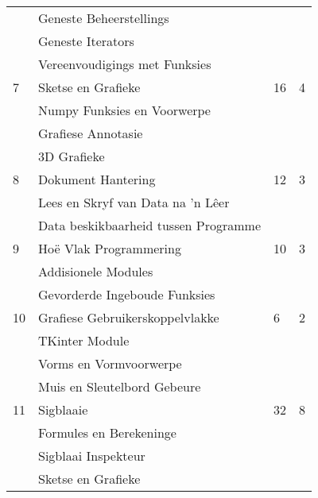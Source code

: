 \begin{table}[!h]
\begin{tabular}{|p{1.4cm}|l|p{2cm}|p{2cm}|}
                    & \qquad Geneste Beheerstellings                        &    &   \\
                    & \qquad Geneste Iterators                  &    &   \\
                    & \qquad Vereenvoudigings met Funksies                        &    &   \\
                 7  & Sketse en Grafieke                        & 16 & 4 \\
                    & \qquad Numpy Funksies en Voorwerpe                       &    &   \\
                    & \qquad Grafiese Annotasie                  &    &   \\
                    & \qquad 3D Grafieke                        &    &   \\
                 \hline
                 8  & Dokument Hantering                        & 12  & 3 \\
                    & \qquad Lees en Skryf van Data na 'n L\^eer     &    &   \\                 
                    & \qquad Data beskikbaarheid tussen Programme                        &    &   \\
                 \hline
                 9  & Ho\"{e} Vlak Programmering                & 10 & 3 \\
                    & \qquad Addisionele Modules                &    &   \\    
                    & \qquad Gevorderde Ingeboude Funksies           &    &   \\
                 \hline
                 10  & Grafiese Gebruikerskoppelvlakke                & 6 & 2 \\
                    & \qquad TKinter Module                &    &   \\    
                    & \qquad Vorms en Vormvoorwerpe          &    &   \\
                    & \qquad Muis en Sleutelbord Gebeure          &    &   \\
                 \hline
                 11  & Sigblaaie                                 & 32 & 8 \\
                    & \qquad Formules en Berekeninge            &    &   \\
                    & \qquad Sigblaai Inspekteur                &    &   \\
                    & \qquad Sketse en Grafieke                 &    &   \\

\end{tabular}
\end{table}
